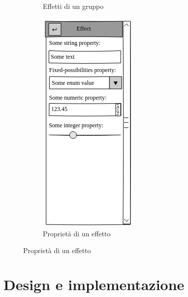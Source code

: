 \documentclass[%
]{beamer}
\begin{document}
\begin{frame}
\begin{figure}[htbp]
\begin{subfigure}{.2\textwidth}
                        \caption{Effetti di un gruppo}
                        \label{fig:mock:effects}
                    \end{subfigure}
                    \qquad{\LARGE$\Rightarrow$}\qquad
                    \pause
                    \begin{subfigure}{.2\textwidth}
                        \includegraphics[scale=0.4]{mock/crop/properties}
                        \caption{Proprietà di un effetto}
                        \label{fig:mock:properties}
                    \end{subfigure}
                \end{figure}
            \end{frame}

    \section{Design e implementazione}\label{sec:newgui}
\end{document}
